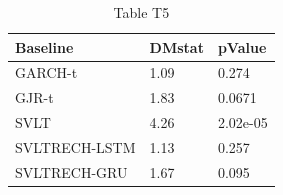 \begin{table}[htbp]
\centering
\caption{Table T5}
\label{tab:T5}
\begin{tabular}{lll}
\toprule
Baseline & DMstat & pValue \\
\midrule
GARCH-t & 1.09 & 0.274 \\
GJR-t & 1.83 & 0.0671 \\
SVLT & 4.26 & 2.02e-05 \\
SVLTRECH-LSTM & 1.13 & 0.257 \\
SVLTRECH-GRU & 1.67 & 0.095 \\
\bottomrule
\end{tabular}
\end{table}